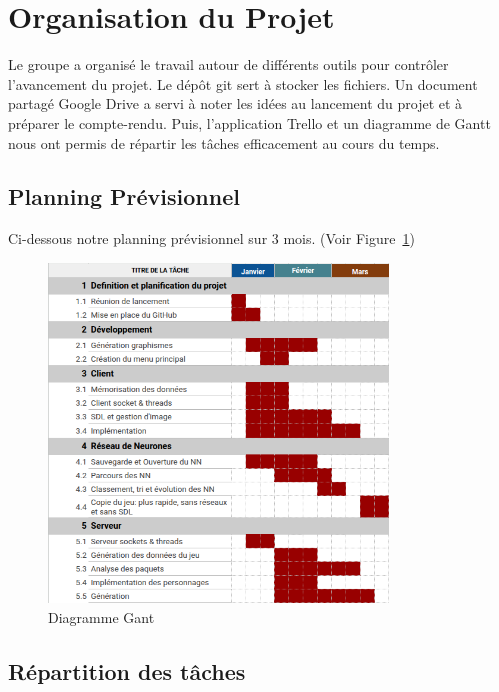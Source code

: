 \documentclass[11pt]{article}
\begin{document}
    \section{Organisation du Projet}
    Le groupe a organisé le travail autour de différents outils pour contrôler l’avancement du projet. Le dépôt git sert à stocker les fichiers. Un document partagé Google Drive a servi à noter les idées au lancement du projet et à préparer le compte-rendu. Puis, l’application Trello et un diagramme de Gantt nous ont permis de répartir les tâches efficacement au cours du temps.

        \subsection{Planning Prévisionnel}
        Ci-dessous notre planning prévisionnel sur 3 mois. (Voir Figure~\ref{fig:Gant})
        \begin{figure}[H]
            \begin{center}
                \includegraphics[height=9cm]{gant.png}
                \caption{Diagramme Gant}
                \label{fig:Gant} 
            \end{center}
        \end{figure}
        \subsection{Répartition des tâches}
\end{document}
